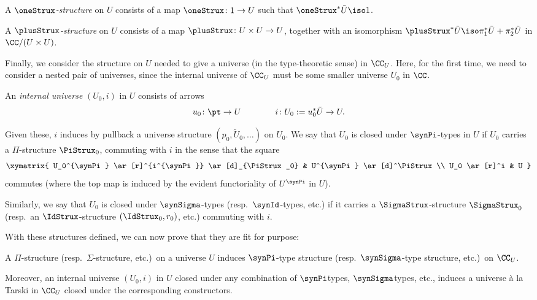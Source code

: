 \begin{definition}
A \emph{$\oneStrux$-structure} on $U$ consists of a map $\oneStrux \colon 1 \to U$ such that $\oneStrux^* \tilde{U} \iso 1$.
\end{definition}

\begin{definition}
A \emph{$\plusStrux$-structure} on $U$ consists of a map $\plusStrux \colon U \times U \to U$, together with an isomorphism $\plusStrux^* \tilde{U} \iso \pi_1^* \tilde{U} + \pi_2^* \tilde{U}$ in $\CC/(U \times U)$.
\end{definition}

Finally, we consider the structure on $U$ needed to give a universe (in the type-theoretic sense) in $\CC_U$.  Here, for the first time, we need to consider a nested pair of universes, since the internal universe of $\CC_U$ must be some smaller universe $U_0$ in $\CC$.

\begin{definition}
An \emph{internal universe} $(U_0,i)$ in $U$ consists of arrows 
\[ u_0 \colon \pt \to U \qquad \qquad i \colon U_0 := u_0^* \tilde{U} \to U. \]

Given these, $i$ induces by pullback a universe structure $(p_0,\tilde{U}_0,\ldots)$ on $U_0$.  We say that $U_0$ is closed under $\synPi$-types in $U$ if $U_0$ carries a $\Pi$-structure $\PiStrux_0$, commuting with $i$ in the sense that the square
\[ \xymatrix{ U_0^{\synPi} \ar[r]^{i^{\synPi}} \ar[d]_{\PiStrux_0} & U^{\synPi} \ar[d]^\PiStrux \\
              U_0 \ar[r]^i & U } \]
commutes (where the top map is induced by the evident functoriality of $U^{\synPi}$ in $U$).

Similarly, we say that $U_0$ is closed under $\synSigma$-types (resp.\ $\synId$-types, etc.) if it carries a $\SigmaStrux$-structure $\SigmaStrux_0$ (resp.\ an $\IdStrux$-structure $(\IdStrux_0,r_0)$, etc.) commuting with $i$.
\end{definition}

With these structures defined, we can now prove that they are fit for purpose:

\begin{theorem} \label{thm:structure-on-U-to-CU}
A $\Pi$-structure (resp.\ $\Sigma$-structure, etc.)\ on a universe $U$ induces $\synPi$-type structure (resp.\ $\synSigma$-type structure, etc.)\ on $\CC_U$.

Moreover, an internal universe $(U_0,i)$ in $U$ closed under any combination of $\synPi$\nbhyph types, $\synSigma$\nbhyph types, etc., induces a universe à la Tarski in $\CC_U$ closed under the corresponding constructors.
\end{theorem}


